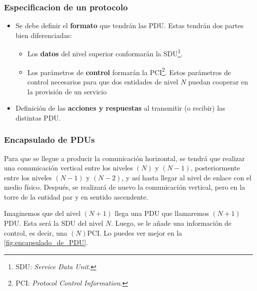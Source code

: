\documentclass[a4paper]{book}
\begin{document}
\subsubsection{Especificacion de un protocolo}
\vspace{1.5\parskip}
\begin{itemize}
  \item Se debe definir el \textbf{formato} que tendrán las PDU. Estas tendrán dos partes bien diferenciadas:
        \begin{itemize}
          \item Los \textbf{datos} del nivel superior conformarán la SDU\footnote{SDU: \textsl{Service Data Unit}.}.
          \item Los parámetros de \textbf{control} formarán la PCI\footnote{PCI: \textsl{Protocol Control Information}.}. Estos parámetros de control necesarios para que dos entidades de nivel $N$ puedan cooperar en la provisión de un servicio
        \end{itemize}
  \item Definición de las \textbf{acciones y respuestas} al transmitir (o recibir) las distintas PDU.
\end{itemize}

\subsubsection{Encapsulado de PDUs}
Para que se llegue a producir la comunicación horizontal, se tendrá que realizar una comunicación vertical entre los niveles $(N)$ y $(N-1)$, posteriormente entre los niveles $(N-1)$ y $(N-2)$, y así hasta llegar al nivel de enlace con el medio físico. Después, se realizará de nuevo la comunicación vertical, pero en la torre de la entidad par y en sentido ascendente.

Imaginemos que del nivel $(N+1)$ llega una PDU que llamaremos $(N+1)$PDU. Esta será la SDU del nivel $N$. Luego, se le añade una información de control, es decir, una $(N)$PCI. Lo puedes ver mejor en la \autoref{fig:encapsulado_de_PDU}.
\end{document}
